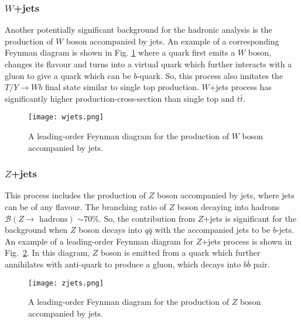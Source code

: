 \subsubsection{$W$+jets}%
\label{sec:analysisstrategy:w+jets}
Another potentially significant background for the hadronic analysis is the production of $W$ boson accompanied by jets. An example of a corresponding Feynman diagram is shown in Fig. \ref{fig:analysisstrategy:wjets} where a quark first emits a $W$ boson, changes its flavour and turns into a virtual quark which further interacts with a gluon to give a quark which can be $b$-quark. So, this process also imitates the $T/Y\rightarrow Wb$ final state similar to single top production. $W$+jets process has significantly higher production-cross-section than single top and $t\bar{t}$.

\begin{figure}[hbt!]
	\centering
	\texttt{[image: wjets.png]}
	\caption{A leading-order Feynman diagram for the production of $W$ boson accompanied by jets.}
	\label{fig:analysisstrategy:wjets}
\end{figure}

\subsubsection{$Z$+jets}%
\label{sec:analysisstrategy:z+jets}
This process includes the production of $Z$ boson accompanied by jets, where jets can be of any flavour. The branching ratio of $Z$ boson decaying into hadrons $\mathcal{B}(Z\rightarrow\text{ hadrons})$ $\sim70\%$. So, the contribution from $Z$+jets is significant for the background when $Z$ boson decays into $q\bar{q}$ with the accompanied jets to be $b$-jets. An example of a leading-order Feynman diagram for $Z$+jets process is shown in Fig.\ \ref{fig:analysisstrategy:zjets}. In this diagram, $Z$ boson is emitted from a quark which further annihilates with anti-quark to produce a gluon, which decays into $b\bar{b}$ pair.

\begin{figure}[hbt!]
	\centering
	\texttt{[image: zjets.png]}
	\caption{A leading-order Feynman diagram for the production of $Z$ boson accompanied by jets.}
	\label{fig:analysisstrategy:zjets}
\end{figure}

